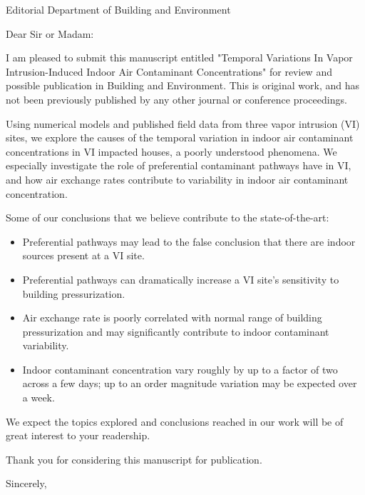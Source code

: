 \documentclass{letter}
\begin{document}
\begin{letter}{Editorial Department of Building and Environment}
\opening{Dear Sir or Madam:}

I am pleased to submit this manuscript entitled "Temporal Variations In Vapor Intrusion-Induced Indoor Air Contaminant Concentrations" for review and possible publication in Building and Environment.
This is original work, and has not been previously published by any other journal or conference proceedings.

Using numerical models and published field data from three vapor intrusion (VI) sites, we explore the causes of the temporal variation in indoor air contaminant concentrations in VI impacted houses, a poorly understood phenomena.
We especially investigate the role of preferential contaminant pathways have in VI, and how air exchange rates contribute to variability in indoor air contaminant concentration.

Some of our conclusions that we believe contribute to the state-of-the-art:
\begin{itemize}
  \item Preferential pathways may lead to the false conclusion that there are indoor sources present at a VI site.
  \item Preferential pathways can dramatically increase a VI site's sensitivity to building pressurization.
  \item Air exchange rate is poorly correlated with normal range of building pressurization and may significantly contribute to indoor contaminant variability.
  \item Indoor contaminant concentration vary roughly by up to a factor of two across a few days; up to an order magnitude variation may be expected over a week.
\end{itemize}
We expect the topics explored and conclusions reached in our work will be of great interest to your readership.

Thank you for considering this manuscript for publication.
\closing{Sincerely,}

\end{letter}
\end{document}
